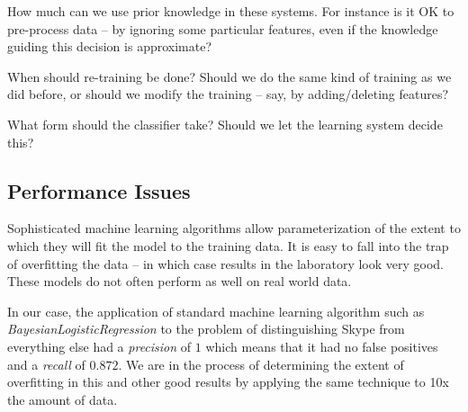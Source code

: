 How much can we use prior knowledge in these systems. For instance is it
OK to pre-process data -- by ignoring some particular features, even if the 
knowledge guiding this decision is approximate?

When should re-training be done?  Should we do the same kind of training
as we did before, or should we modify the training -- say, by adding/deleting
features? 

What form should the classifier take? Should we let the learning system decide this? 

\subsection{Performance Issues}
Sophisticated machine learning algorithms allow parameterization of
the extent to which they will fit the model to the training data. It
is easy to fall into the trap of overfitting the data -- in which case
results in the laboratory look very good. These models do not often 
perform as well on real world data.  

In our case, the application of standard machine learning algorithm
such as \emph{BayesianLogisticRegression} to the problem of distinguishing
Skype from everything else had a \emph{precision} of $1$ which means that
it had no false positives and a \emph{recall} of $0.872$.  We are in the
process of determining the extent of overfitting in this and other good
results by applying the same technique to 10x the amount of data.  
